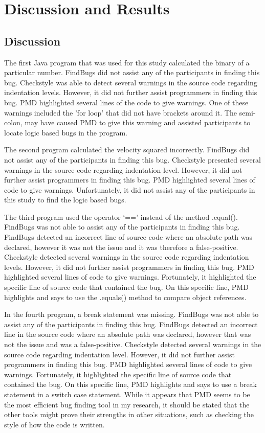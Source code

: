 \chapter{Discussion and Results}\label{ch:resultsanddiscussion}

\section{Discussion}

The first Java program that was used for this study calculated the binary of a particular number. FindBugs did not assist any of the participants in finding this bug. Checkstyle was able to detect several warnings in the source code regarding indentation levels. However, it did not further assist programmers in finding this bug. PMD highlighted several lines of the code to give warnings. One of these warnings included the 'for loop' that did not have brackets around it. The semi-colon, may have caused PMD to give this warning and assisted participants to locate logic based bugs in the program.

The second program calculated the velocity squared incorrectly. FindBugs did not assist any of the participants in finding this bug. Checkstyle presented several warnings in the source code regarding indentation level. However, it did not further assist programmers in finding this bug. PMD highlighted several lines of code to give warnings. Unfortunately, it did not assist any of the participants in this study to find the logic based bugs.

The third program used the operator `==' instead of the method .equal(). FindBugs was not able to assist any of the participants in finding this bug. FindBugs detected an incorrect line of source code where an absolute path was declared, however it was not the issue and it was therefore a false-positive. Checkstyle detected several warnings in the source code regarding indentation levels. However, it did not further assist programmers in finding this bug. PMD  highlighted several lines of code to give warnings. Fortunately, it highlighted the specific line of source code that contained the bug. On this specific line, PMD highlights and says to use the .equals() method to compare object references.

In the fourth program, a break statement was missing. FindBugs was not able to assist any of the participants in finding this bug. FindBugs detected an incorrect line in the source code where an absolute path was declared, however that was not the issue and was a false-positive. Checkstyle detected several warnings in the source code regarding indentation level. However, it did not further assist programmers in finding this bug. PMD highlighted several lines of code to give warnings. Fortunately, it highlighted the specific line of source code that contained the bug. On this specific line, PMD highlights and says to use a break statement in a switch case statement. While it appears that PMD seems to be the most efficient bug finding tool in my research, it should be stated that the other tools might prove their strengths in other situations, such as checking the style of how the code is written. 


